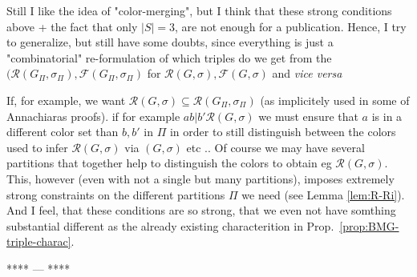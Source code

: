 \documentclass[final,3p,times]{elsarticle}
\begin{document}
{ Still I like the idea of "color-merging", but I think that these 
 strong conditions above + the fact that only $|S|=3$, are
  not enough for a publication. Hence, I try to generalize, 
 but still have some doubts, since everything is just a 
 "combinatorial" re-formulation of which triples do we get 
 from the $(\mathscr{R}(G_{\Pi},\sigma_{\Pi}),\mathscr{F}(G_{\Pi},\sigma_{\Pi})$
 for $\mathscr{R}(G,\sigma),\mathscr{F}(G,\sigma)$ and \emph{vice versa}

  If, for example, we want 
  $\mathscr{R}(G,\sigma)\subseteq \mathscr{R}(G_{\Pi},\sigma_{\Pi})$
  (as implicitely used in some of Annachiaras proofs). 
  if for example $ab|b'\mathscr{R}(G,\sigma)$ we must ensure that $a$ is in a different color set than $b,b'$
  in $\Pi$ in order to still distinguish between the colors 
  used to infer $\mathscr{R}(G,\sigma)$ via $(G,\sigma)$ etc .. 
  Of course we may have several partitions that together help
  to  distinguish the colors to obtain eg $\mathscr{R}(G,\sigma)$. 
  This, however (even with not a single but many partitions),  imposes
   extremely strong constraints on the different partitions $\Pi$
   we need (see Lemma \ref{lem:R-Ri}). 
  And I feel, that these conditions are so strong, that 
  we even not have somthing substantial different as
  the already existing characterition in Prop.\ \ref{prop:BMG-triple-charac}.
\begin{center}**** --- **** \end{center}
}
\end{document}
